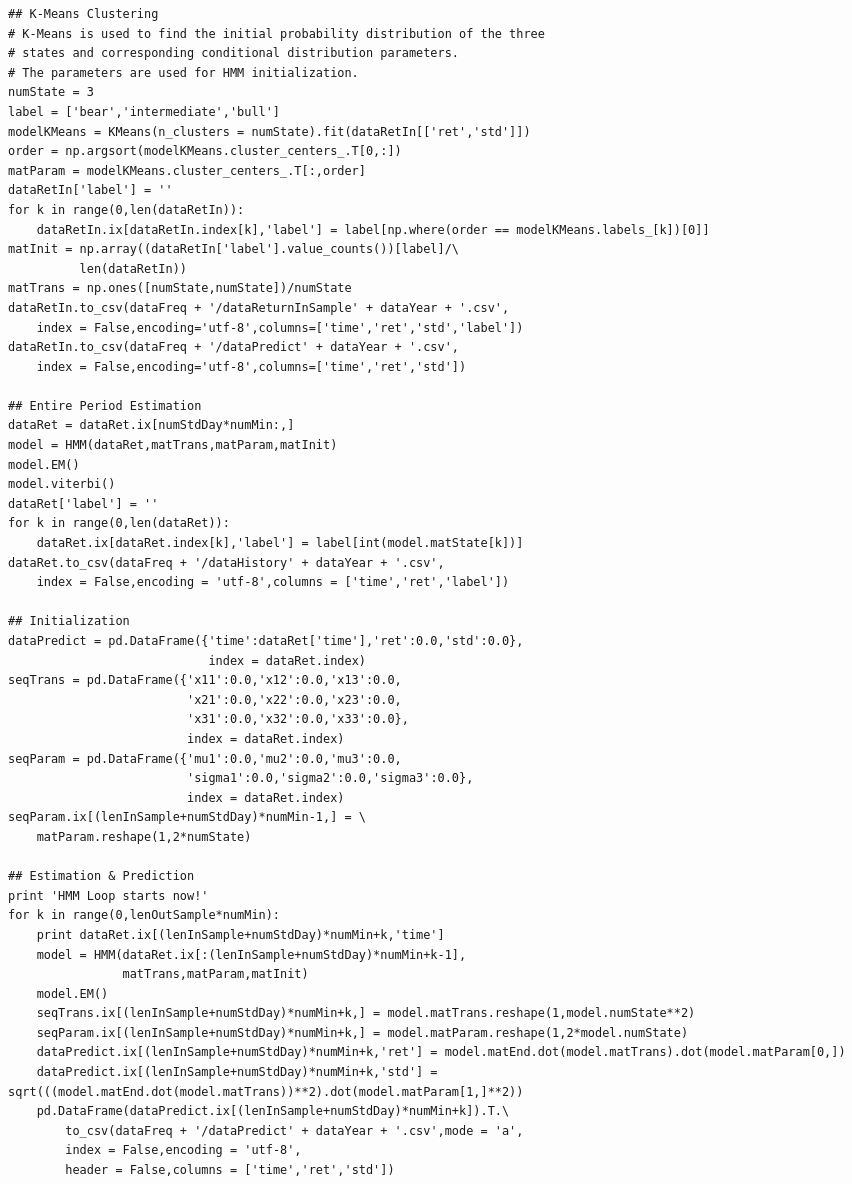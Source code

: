 \begin{spacing}{1.2}
\begin{lstlisting}
## K-Means Clustering
# K-Means is used to find the initial probability distribution of the three
# states and corresponding conditional distribution parameters. 
# The parameters are used for HMM initialization.
numState = 3
label = ['bear','intermediate','bull']
modelKMeans = KMeans(n_clusters = numState).fit(dataRetIn[['ret','std']])
order = np.argsort(modelKMeans.cluster_centers_.T[0,:])
matParam = modelKMeans.cluster_centers_.T[:,order]
dataRetIn['label'] = ''
for k in range(0,len(dataRetIn)):
    dataRetIn.ix[dataRetIn.index[k],'label'] = label[np.where(order == modelKMeans.labels_[k])[0]]
matInit = np.array((dataRetIn['label'].value_counts())[label]/\
          len(dataRetIn))
matTrans = np.ones([numState,numState])/numState
dataRetIn.to_csv(dataFreq + '/dataReturnInSample' + dataYear + '.csv',
    index = False,encoding='utf-8',columns=['time','ret','std','label'])
dataRetIn.to_csv(dataFreq + '/dataPredict' + dataYear + '.csv',
    index = False,encoding='utf-8',columns=['time','ret','std'])

## Entire Period Estimation
dataRet = dataRet.ix[numStdDay*numMin:,]
model = HMM(dataRet,matTrans,matParam,matInit)
model.EM()
model.viterbi()
dataRet['label'] = ''
for k in range(0,len(dataRet)):
    dataRet.ix[dataRet.index[k],'label'] = label[int(model.matState[k])]
dataRet.to_csv(dataFreq + '/dataHistory' + dataYear + '.csv',
    index = False,encoding = 'utf-8',columns = ['time','ret','label'])

## Initialization
dataPredict = pd.DataFrame({'time':dataRet['time'],'ret':0.0,'std':0.0},
                            index = dataRet.index)
seqTrans = pd.DataFrame({'x11':0.0,'x12':0.0,'x13':0.0,
                         'x21':0.0,'x22':0.0,'x23':0.0,
                         'x31':0.0,'x32':0.0,'x33':0.0},
                         index = dataRet.index)
seqParam = pd.DataFrame({'mu1':0.0,'mu2':0.0,'mu3':0.0,
                         'sigma1':0.0,'sigma2':0.0,'sigma3':0.0},
                         index = dataRet.index)
seqParam.ix[(lenInSample+numStdDay)*numMin-1,] = \
    matParam.reshape(1,2*numState)
                         
## Estimation & Prediction
print 'HMM Loop starts now!'
for k in range(0,lenOutSample*numMin):
    print dataRet.ix[(lenInSample+numStdDay)*numMin+k,'time']
    model = HMM(dataRet.ix[:(lenInSample+numStdDay)*numMin+k-1],
                matTrans,matParam,matInit)
    model.EM()
    seqTrans.ix[(lenInSample+numStdDay)*numMin+k,] = model.matTrans.reshape(1,model.numState**2)
    seqParam.ix[(lenInSample+numStdDay)*numMin+k,] = model.matParam.reshape(1,2*model.numState)
    dataPredict.ix[(lenInSample+numStdDay)*numMin+k,'ret'] = model.matEnd.dot(model.matTrans).dot(model.matParam[0,])
    dataPredict.ix[(lenInSample+numStdDay)*numMin+k,'std'] = sqrt(((model.matEnd.dot(model.matTrans))**2).dot(model.matParam[1,]**2))
    pd.DataFrame(dataPredict.ix[(lenInSample+numStdDay)*numMin+k]).T.\
        to_csv(dataFreq + '/dataPredict' + dataYear + '.csv',mode = 'a',
        index = False,encoding = 'utf-8',
        header = False,columns = ['time','ret','std'])


\end{lstlisting}
\end{spacing}
